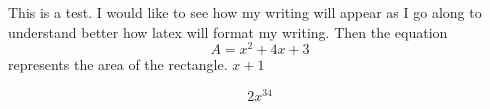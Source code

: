 \documentclass[11pt,a4paper,portrait]{article}
\begin{document}
This is a test. I would like to see how my writing will appear as I go along to understand better how latex will format my writing.
Then the equation $$A=x^2+4x+3$$ represents the area of the rectangle.
$x+1$

$$2x^{34}$$
\end{document}
